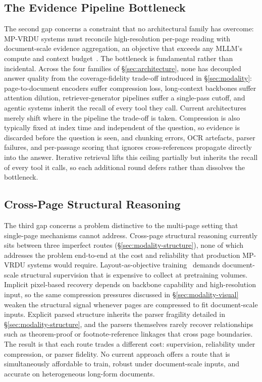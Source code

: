 \documentclass[11pt]{article}
\begin{document}
\subsection{The Evidence Pipeline Bottleneck}
\label{sec:gap-evidence}

The second gap concerns a constraint that no architectural family has overcome: MP-VRDU systems must reconcile high-resolution per-page reading with document-scale evidence aggregation, an objective that exceeds any MLLM's compute and context budget~\cite{ma2024mmlongbenchdoc}. The bottleneck is fundamental rather than incidental. Across the four families of \S\ref{sec:architecture}, none has decoupled answer quality from the coverage-fidelity trade-off introduced in \S\ref{sec:modality}: page-to-document encoders suffer compression loss, long-context backbones suffer attention dilution, retriever-generator pipelines suffer a single-pass cutoff, and agentic systems inherit the recall of every tool they call. Current architectures merely shift where in the pipeline the trade-off is taken. Compression is also typically fixed at index time and independent of the question, so evidence is discarded before the question is seen, and chunking errors, OCR artefacts, parser failures, and per-passage scoring that ignores cross-references propagate directly into the answer. Iterative retrieval lifts this ceiling partially but inherits the recall of every tool it calls, so each additional round defers rather than dissolves the bottleneck.

\subsection{Cross-Page Structural Reasoning}
\label{sec:gap-structure}

The third gap concerns a problem distinctive to the multi-page setting that single-page mechanisms cannot address. Cross-page structural reasoning currently sits between three imperfect routes (\S\ref{sec:modality-structure}), none of which addresses the problem end-to-end at the cost and reliability that production MP-VRDU systems would require. Layout-as-objective training~\cite{hu2025mplugdocowl2,duan2025docopilot} demands document-scale structural supervision that is expensive to collect at pretraining volumes. Implicit pixel-based recovery depends on backbone capability and high-resolution input, so the same compression pressures discussed in \S\ref{sec:modality-visual} weaken the structural signal whenever pages are compressed to fit document-scale inputs. Explicit parsed structure inherits the parser fragility detailed in \S\ref{sec:modality-structure}, and the parsers themselves rarely recover relationships such as theorem-proof or footnote-reference linkages that cross page boundaries. The result is that each route trades a different cost: supervision, reliability under compression, or parser fidelity. No current approach offers a route that is simultaneously affordable to train, robust under document-scale inputs, and accurate on heterogeneous long-form documents.
\end{document}

